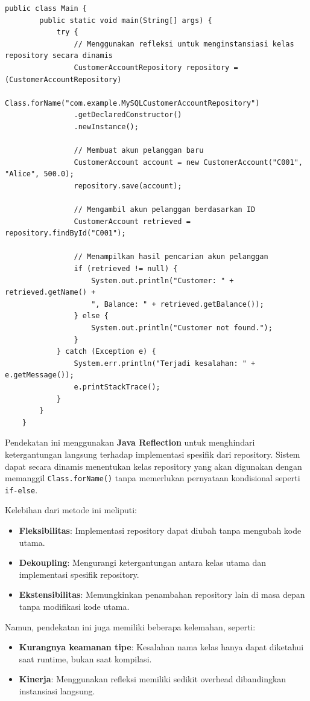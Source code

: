 \begin{lstlisting}[style=JavaStyle, caption=Console Application Example, label=lst:console_app]
	public class Main {
		public static void main(String[] args) {
			try {
				// Menggunakan refleksi untuk menginstansiasi kelas repository secara dinamis
				CustomerAccountRepository repository = (CustomerAccountRepository)
				Class.forName("com.example.MySQLCustomerAccountRepository")
				.getDeclaredConstructor()
				.newInstance();
				
				// Membuat akun pelanggan baru
				CustomerAccount account = new CustomerAccount("C001", "Alice", 500.0);
				repository.save(account);
				
				// Mengambil akun pelanggan berdasarkan ID
				CustomerAccount retrieved = repository.findById("C001");
				
				// Menampilkan hasil pencarian akun pelanggan
				if (retrieved != null) {
					System.out.println("Customer: " + retrieved.getName() + 
					", Balance: " + retrieved.getBalance());
				} else {
					System.out.println("Customer not found.");
				}
			} catch (Exception e) {
				System.err.println("Terjadi kesalahan: " + e.getMessage());
				e.printStackTrace();
			}
		}
	}
\end{lstlisting}

Pendekatan ini menggunakan \textbf{Java Reflection} untuk menghindari ketergantungan langsung terhadap implementasi spesifik dari repository. Sistem dapat secara dinamis menentukan kelas repository yang akan digunakan dengan memanggil \texttt{Class.forName()} tanpa memerlukan pernyataan kondisional seperti \texttt{if-else}.

Kelebihan dari metode ini meliputi:
\begin{itemize}
	\item \textbf{Fleksibilitas}: Implementasi repository dapat diubah tanpa mengubah kode utama.
	\item \textbf{Dekoupling}: Mengurangi ketergantungan antara kelas utama dan implementasi spesifik repository.
	\item \textbf{Ekstensibilitas}: Memungkinkan penambahan repository lain di masa depan tanpa modifikasi kode utama.
\end{itemize}

Namun, pendekatan ini juga memiliki beberapa kelemahan, seperti:
\begin{itemize}
	\item \textbf{Kurangnya keamanan tipe}: Kesalahan nama kelas hanya dapat diketahui saat runtime, bukan saat kompilasi.
	\item \textbf{Kinerja}: Menggunakan refleksi memiliki sedikit overhead dibandingkan instansiasi langsung.
\end{itemize}

